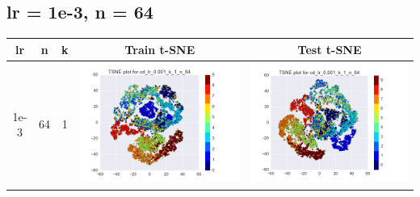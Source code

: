 \documentclass[12pt]{report}
\begin{document}
\subsection{lr = 1e-3, n = 64}
\begin{table}[H]
  \centering
  \begin{tabular}{ | c | c | c | c || c |}
    \hline
    \textbf{lr} & \textbf{n} & \textbf{k} & \textbf{Train t-SNE} & \textbf{Test t-SNE} \\ \hline
    1e-3 & 64 & 1 &
    \begin{minipage}{.3\textwidth}
      \includegraphics[scale=0.25]{cd_lr_0_001_k_1_n_64.png}
    \end{minipage} &
    \begin{minipage}{.3\textwidth}
      \includegraphics[scale=0.25]{test_cd_lr_0_001_k_1_n_64.png}

\end{minipage}
\end{tabular}
\end{table}
\end{document}
